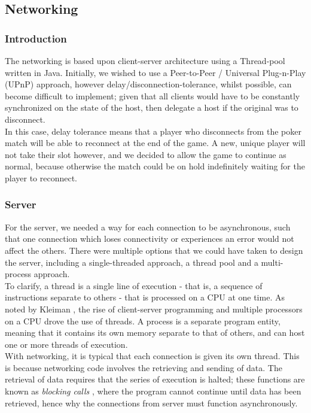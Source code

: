 \documentclass[11pt]{article}
\begin{document}
\newpage
\subsection{Networking}
\subsubsection{Introduction}
The networking is based upon client-server architecture using a Thread-pool written in Java. Initially, we wished to use a Peer-to-Peer / Universal Plug-n-Play (UPnP) approach, however delay/disconnection-tolerance, whilst possible, can become difficult to implement; given that all clients would have to be constantly synchronized on the state of the host, then delegate a host if the original was to disconnect. \\ %

In this case, delay tolerance means that a player who disconnects from the poker match will be able to reconnect at the end of the game. A new, unique player will not take their slot however, and we decided to allow the game to continue as normal, because otherwise the match could be on hold indefinitely waiting for the player to reconnect.

\subsubsection{Server}
For the server, we needed a way for each connection to be asynchronous, such that one connection which loses connectivity or experiences an error would not affect the others. There were multiple options that we could have taken to design the server, including a single-threaded approach, a thread pool and a multi-process approach. \\

To clarify, a thread is a single line of execution - that is, a sequence of instructions separate to others - that is processed on a CPU at one time. As noted by Kleiman \cite{client_server}, the rise of client-server programming and multiple processors on a CPU drove the use of threads. A process is a separate program entity, meaning that it contains its own memory separate to that of others, and can host one or more threads of execution. \\

With networking, it is typical that each connection is given its own thread. This is because networking code involves the retrieving and sending of data. The retrieval of data requires that the series of execution is halted; these functions are known as \textit{blocking calls} \cite{blocking_calls}, where the program cannot continue until data has been retrieved, hence why the connections from server must function asynchronously.  \\
\end{document}
